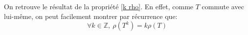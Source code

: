 \begin{rmq}
	On retrouve le résultat de la propriété \ref{k rho}. En effet, comme $T$ commute avec lui-même, on peut facilement montrer par récurrence que:
	$$\forall k \in \mathbb{Z}, \ \rho(T^k)=k\rho(T)$$
\end{rmq}


























